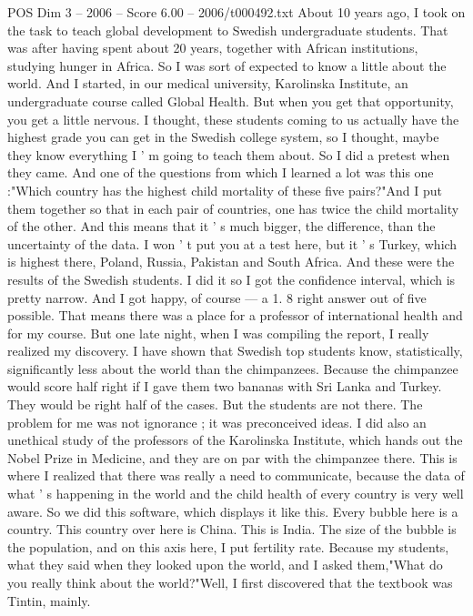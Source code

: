 \begin{textsample}{POS Dim 3 – 2006 – Score 6.00 – 2006/t000492.txt}  \label{ex:f3_pos_068}
About 10 years ago, I took on the task to teach global development to Swedish undergraduate students.
That was after having spent about 20 years, together with African institutions, studying hunger in Africa.
So I was sort of expected to know a little about the world.
And I started, in our medical university, Karolinska Institute, an undergraduate course called Global Health.
But when you get that opportunity, you get a little nervous.
I thought, these students coming to us actually have the highest grade you can get in the Swedish college system, so I thought, maybe they know everything I ' m going to teach them about.
So I did a pretest when they came.
And one of the questions from which I learned a lot was this one :"Which country has the highest child mortality of these five pairs?"And I put them together so that in each pair of countries, one has twice the child mortality of the other.
And this means that it ' s much bigger, the difference, than the uncertainty of the data.
I won ' t put you at a test here, but it ' s Turkey, which is highest there, Poland, Russia, Pakistan and South Africa.
And these were the results of the Swedish students.
I did it so I got the confidence interval, which is pretty narrow.
And I got happy, of course — a 1. 8 right answer out of five possible.
That means there was a place for a professor of international health and for my course.
But one late night, when I was compiling the report, I really realized my discovery.
I have shown that Swedish top students know, statistically, significantly less about the world than the chimpanzees.
Because the chimpanzee would score half right if I gave them two bananas with Sri Lanka and Turkey.
They would be right half of the cases.
But the students are not there.
The problem for me was not ignorance ; it was preconceived ideas.
I did also an unethical study of the professors of the Karolinska Institute, which hands out the Nobel Prize in Medicine, and they are on par with the chimpanzee there.
This is where I realized that there was really a need to communicate, because the data of what ' s happening in the world and the child health of every country is very well aware.
So we did this software, which displays it like this.
Every bubble here is a country.
This country over here is China.
This is India.
The size of the bubble is the population, and on this axis here, I put fertility rate.
Because my students, what they said when they looked upon the world, and I asked them,"What do you really think about the world?"Well, I first discovered that the textbook was Tintin, mainly.

\end{textsample}
